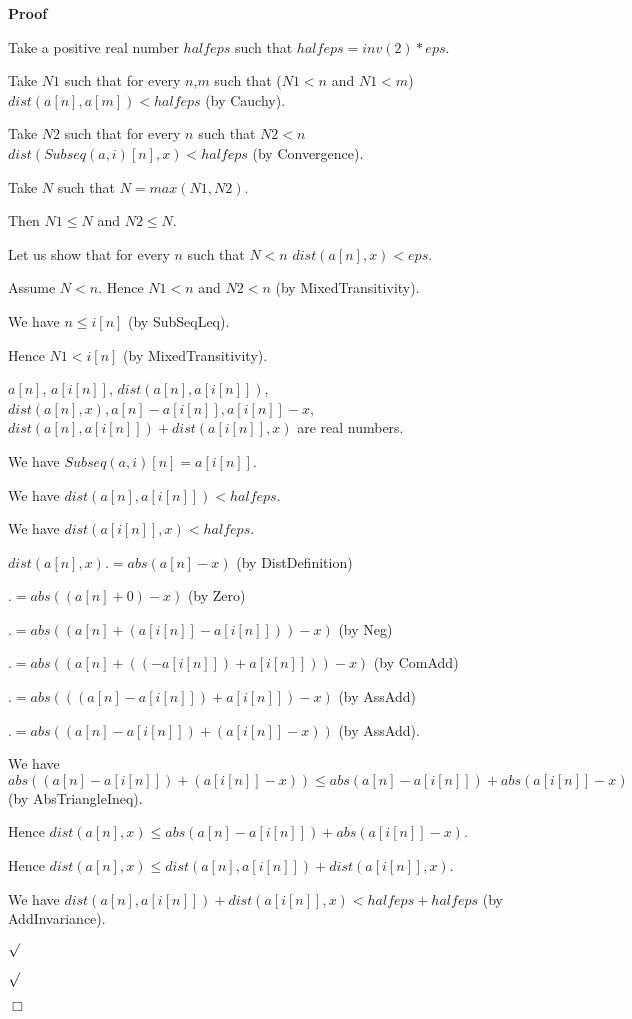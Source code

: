 \documentclass{article}
\newenvironment{forthel}{\begin{leftbar}}{\end{leftbar}}
\newenvironment{proof}{\noindent\textbf{Proof\ }}{\hspace*{\fill}$\Box$\medskip}
\newenvironment{subproof}{\begin{list}{}{}
		\item[\text{Proof}]}{\hfill $\surd$ \end{list}}
\begin{document}
\begin{forthel}
\begin{proof}
\begin{subproof}
			Take a positive real number $halfeps$ such that $halfeps = inv(2) * eps$.
			
			Take $N1$ such that for every $n$,$m$ such that ($N1 < n$ and $N1 < m$) $dist(a[n],a[m]) < halfeps$ (by Cauchy).
			
			Take $N2$ such that for every $n$ such that $N2 < n$ $dist(Subseq(a,i)[n],x) < halfeps$ (by Convergence).
			
			Take $N$ such that $N = max(N1,N2)$.
			
			Then $N1 \leq N$ and $N2 \leq N$.
			
			Let us show that for every $n$ such that $N < n$ $dist(a[n],x) < eps$.
			
			\begin{subproof}
				Assume $N < n$. Hence $N1 < n$ and $N2 < n$ (by MixedTransitivity).
				
				We have $n \leq i[n]$ (by SubSeqLeq).
				
				Hence $N1 < i[n]$ (by MixedTransitivity).
				
				$a[n]$, $a[i[n]]$, $dist(a[n],a[i[n]])$, $dist(a[n],x), a[n] - a[i[n]], a[i[n]] - x$, $dist(a[n],a[i[n]]) + dist(a[i[n]],x)$ are real numbers.
				
				We have $Subseq(a,i)[n] = a[i[n]]$.
				
				We have $dist(a[n],a[i[n]]) < halfeps$.
				
				We have $dist(a[i[n]],x) < halfeps$.
				
				$dist(a[n],x) .= abs(a[n] - x)$ (by DistDefinition)
				
				$.= abs((a[n] + 0) - x)$ (by Zero)
				
				$.= abs((a[n] + (a[i[n]] - a[i[n]])) - x)$ (by Neg)
				
				$.= abs((a[n] + ((-a[i[n]]) + a[i[n]])) - x)$ (by ComAdd)
				
				$.= abs(((a[n] - a[i[n]]) + a[i[n]]) - x)$ (by AssAdd)
				
				$.= abs((a[n] - a[i[n]]) + (a[i[n]] - x))$ (by AssAdd).
				
				We have $abs((a[n] - a[i[n]]) + (a[i[n]] - x)) \leq abs(a[n] - a[i[n]]) + abs(a[i[n]] - x)$ (by AbsTriangleIneq).
				
				Hence $dist(a[n],x) \leq abs(a[n] - a[i[n]]) + abs(a[i[n]] - x)$.
				
				Hence $dist(a[n],x) \leq dist(a[n],a[i[n]]) + dist(a[i[n]],x)$.
				
				We have $dist(a[n],a[i[n]]) + dist(a[i[n]],x) < halfeps + halfeps$ (by AddInvariance).
				

\end{subproof}
\end{subproof}
\end{proof}
\end{forthel}
\end{document}
